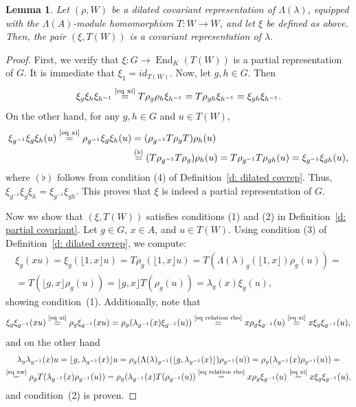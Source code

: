 \documentclass[11pt]{amsart}
\numberwithin{equation}{section}
\newtheorem{lemma}[theorem]{Lemma}
\theoremstyle{definition}
\theoremstyle{remark}
\begin{document}
\begin{lemma}\label{le xi W}
    Let \((\rho, W)\) be a dilated covariant representation of \(\Lambda(\lambda)\), equipped with the \(\Lambda(A)\)-module homomorphism \(T: W \to W\), and let \(\xi\) be defined as above. Then, the pair \((\xi, T(W))\) is a covariant representation of \(\lambda\).
\end{lemma}

\begin{proof}
    First, we verify that \(\xi: G \to \operatorname{End}_K(T(W))\) is a partial representation of \(G\). It is immediate that \(\xi_1 = id_{T(W)}\). Now, let \(g, h \in G\). Then
    \[
        \xi_g \xi_h \xi_{h^{-1}} \overset{\scriptsize\eqref{eq xi}}{=} T\rho_g \rho_h \xi_{h^{-1}} = T\rho_{gh} \xi_{h^{-1}}  = \xi_{gh} \xi_{h^{-1}}.
    \]
   On the other hand, for any $g,h \in G$ and   \(u \in T(W)\),
    \begin{align*}
        \xi _{g^{-1}} \xi_g \xi_h (u)
        \overset{\scriptsize\eqref{eq xi}}{=} \rho _{g^{-1}} \xi_g \xi_h (u)
        &= (\rho _{g^{-1}} T \rho_g T) \rho_h (u)\\
        &\overset{(\flat)}{=}  (T \rho _{g^{-1}} T \rho_g)  \rho_h (u)
        = T \rho _{g^{-1}} T \rho_{gh}  (u)
        =\xi_{g^{-1}} \xi_{gh}(u),
    \end{align*}
    where \((\flat)\) follows from condition (4) of Definition~\ref{d: dilated covrep}.
    Thus, \(\xi_{g^{-1}} \xi_g \xi_h = \xi_{g^{-1}} \xi_{gh}\).
    This proves that \(\xi\) is indeed a partial representation of \(G\).

    Now we show that \((\xi, T(W))\) satisfies conditions (1) and (2) in Definition~\ref{d: partial covariant}. Let \(g \in G\), \(x \in A\), and \(u \in T(W)\). Using condition (3) of Definition~\ref{d: dilated covrep}, we compute:
    \begin{multline*}
        \xi_g(xu)=\xi_g(\lfloor 1,x\rfloor u)=T\rho_g(\lfloor 1,x\rfloor u)=T(\Lambda(\lambda)_g(\lfloor 1,x\rfloor)\rho_g(u))=\\= T(\lfloor g,x\rfloor \rho_g(u))=\lfloor g,x\rfloor T(\rho_g(u))=\lambda_g(x)\xi_g(u),
    \end{multline*}
    showing condition~(1). Additionally, note that
    \[
        \xi_g \xi_{g^{-1}}(xu) \overset{\scriptsize\eqref{eq xi}}{=} \rho_g \xi_{g^{-1}}(xu) = \rho_g(\lambda_{g^{-1}}(x)\xi_{g^{-1}}(u)) \overset{\scriptsize\eqref{eq relation rho}}{=} x\rho_g \xi_{g^{-1}}(u) \overset{\scriptsize\eqref{eq xi}}{=} x\xi_g \xi_{g^{-1}}(u),
    \]
    and on the other hand
    \begin{multline*}
        \lambda_g\lambda_{g^{-1}}(x)u=\lfloor g,\lambda_{g^{-1}}(x)\rfloor u= \rho_g(\Lambda(\lambda)_{g^{-1}}(\lfloor g,\lambda_{g^{-1}}(x)\rfloor)\rho_{g^{-1}}(u))=\rho_g(\lambda_{g^{-1}}(x)\rho_{g^{-1}}(u))=\\\overset{\scriptsize\eqref{eq xw}}{=}\rho_g T(\lambda_{g^{-1}}(x)\rho_{g^{-1}}(u))=\rho_g(\lambda_{g^{-1}}(x)T(\rho_{g^{-1}}(u))\overset{\scriptsize\eqref{eq relation rho}}{=}x\rho_g\xi_{g^{-1}}(u)\overset{\scriptsize\eqref{eq xi}}{=}x\xi_g\xi_{g^{-1}}(u),
    \end{multline*}
    and condition~(2) is proven.
\end{proof}
\end{document}
